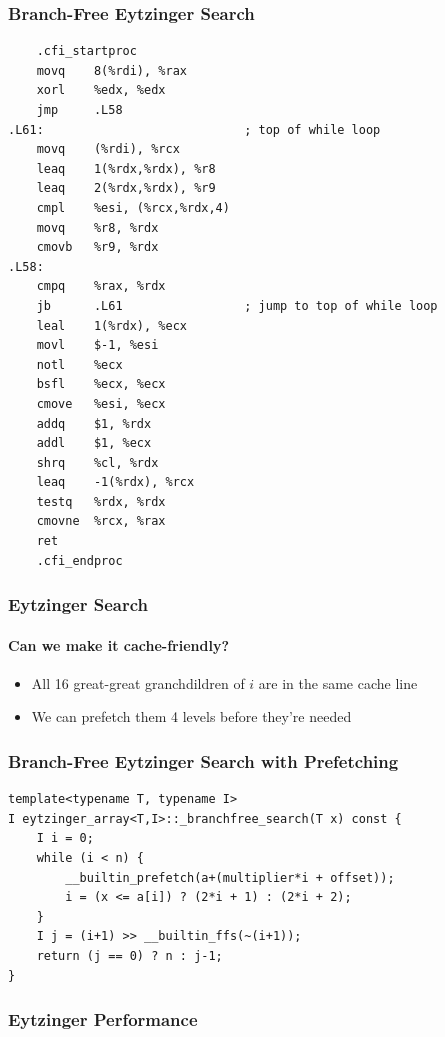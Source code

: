 \documentclass[xcolor=dvipsnames]{beamer}
\begin{document}
\begin{frame}[fragile]
\frametitle{Branch-Free Eytzinger Search}

{\tiny
\begin{verbatim}
    .cfi_startproc
    movq    8(%rdi), %rax
    xorl    %edx, %edx
    jmp     .L58
.L61:                            ; top of while loop
    movq    (%rdi), %rcx
    leaq    1(%rdx,%rdx), %r8
    leaq    2(%rdx,%rdx), %r9
    cmpl    %esi, (%rcx,%rdx,4)
    movq    %r8, %rdx
    cmovb   %r9, %rdx
.L58:
    cmpq    %rax, %rdx
    jb      .L61                 ; jump to top of while loop
    leal    1(%rdx), %ecx
    movl    $-1, %esi
    notl    %ecx
    bsfl    %ecx, %ecx
    cmove   %esi, %ecx
    addq    $1, %rdx
    addl    $1, %ecx
    shrq    %cl, %rdx
    leaq    -1(%rdx), %rcx
    testq   %rdx, %rdx
    cmovne  %rcx, %rax
    ret
    .cfi_endproc
\end{verbatim}
}
\end{frame}


\begin{frame}
\frametitle{Eytzinger Search}
\framesubtitle{Can we make it cache-friendly?}

\begin{center}
\end{center}
\begin{itemize}
   \item<4-> All 16 great-great granchdildren of $i$ are in the same cache line
   \item<5-> We can prefetch them 4 levels before they're needed
\end{itemize}
\end{frame}

\begin{frame}[fragile]
   \frametitle{Branch-Free Eytzinger Search with Prefetching}

{\small 
\begin{verbatim}
template<typename T, typename I>
I eytzinger_array<T,I>::_branchfree_search(T x) const {
    I i = 0;
    while (i < n) {
        __builtin_prefetch(a+(multiplier*i + offset));
        i = (x <= a[i]) ? (2*i + 1) : (2*i + 2);
    }
    I j = (i+1) >> __builtin_ffs(~(i+1));
    return (j == 0) ? n : j-1;
}
\end{verbatim} 
}
\end{frame}


\begin{frame}
  \frametitle{Eytzinger Performance}

  \begin{center}
  \end{center}
\end{frame}
\end{document}
